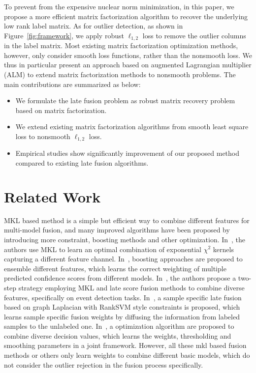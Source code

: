 \documentclass[letterpaper]{article}
\begin{document}
To prevent from the expensive nuclear norm minimization, in this paper, we propose a more efficient matrix factorization algorithm to recover the underlying low rank label matrix.
As for outlier detection, as shown in Figure~\ref{fig:framework}, we apply robust $\ell_{1,2}$ loss to remove the outlier columns in the label matrix.
Most existing matrix factorization optimization methods, however, only consider smooth loss functions, rather than the nonsmooth loss.
We thus in particular present an approach based on augmented Lagrangian multiplier (ALM) to extend matrix factorization methods to nonsmooth problems.
The main contributions are summarized as below:
\begin{itemize}
  \item We formulate the late fusion problem as robust matrix recovery problem based on matrix factorization.
  \item We extend existing matrix factorization algorithms from smooth least square loss to nonsmooth $\ell_{1,2}$ loss.
  \item Empirical studies show significantly improvement of our proposed method compared to existing late fusion algorithms.
\end{itemize}




\section{Related Work}

MKL based method is a simple but efficient way to combine different features for multi-model fusion,
and many improved algorithms have been proposed by introducing more constraint, boosting methods and other optimization.
In~\cite{vedaldi2009multiple}, the authors use MKL to learn an optimal combination of exponential ${\chi}^2$ kernels capturing a different feature channel. 
In~\cite{gehler2009feature}, boosting approaches are proposed to ensemble different features, which learns the correct weighting of multiple predicted confidence scores from different models.
In~\cite{natarajan2012multimodal}, the authors propose a two-step strategy employing MKL and late score fusion methods to combine diverse features, specifically on event detection tasks.
In~\cite{lai2015learning}, a sample specific late fusion based on graph Laplacian with RankSVM style constraints is proposed,
which learns sample specific fusion weights by diffusing the information from labeled samples to the unlabeled one.
In~\cite{xuiccv2013feature}, a optimization algorithm are proposed to combine diverse decision values, 
which learns the weights, thresholding and smoothing parameters in a joint framework.
However, all these mkl based fusion methods or others only learn weights to combine different basic models, which do not consider the outlier rejection in the fusion process specifically.
\end{document}
